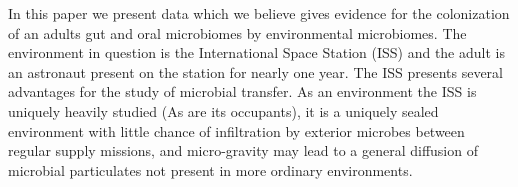 In this paper we present data which we believe gives evidence for the colonization of an adults gut and oral microbiomes by environmental microbiomes. The environment in question is the International Space Station (ISS) and the adult is an astronaut present on the station for nearly one year. The ISS presents several advantages for the study of microbial transfer. As an environment the ISS is uniquely heavily studied (As are its occupants), it is a uniquely sealed environment with little chance of infiltration by exterior microbes between regular supply missions, and micro-gravity may lead to a general diffusion of microbial particulates not present in more ordinary environments. 
